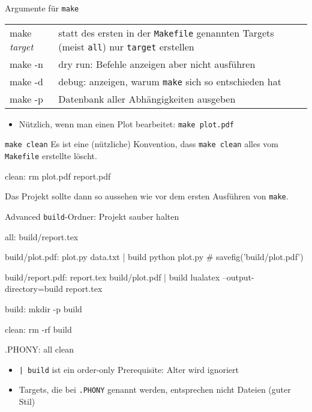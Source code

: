 \begin{frame}[fragile]{Argumente für \texttt{make}}
  \begin{tabu}{>{\ttfamily}l X[,L]}
    make \textit{target} & statt des ersten in der \texttt{Makefile} genannten Targets (meist \texttt{all}) nur \texttt{target} erstellen \\
    make -n              & dry run: Befehle anzeigen aber nicht ausführen \\
    make -d              & debug: anzeigen, warum \texttt{make} sich so entschieden hat \\
    make -p              & Datenbank aller Abhängigkeiten ausgeben
  \end{tabu}
  \begin{itemize}
    \item Nützlich, wenn man einen Plot bearbeitet: \texttt{make plot.pdf}
  \end{itemize}
\end{frame}

\begin{frame}[fragile]{\texttt{make clean}}
  Es ist eine (nützliche) Konvention, dass \texttt{make clean} alles vom \texttt{Makefile} erstellte löscht.

  \begin{center}
    \begin{lstmake}
      clean:
          rm plot.pdf report.pdf
    \end{lstmake}
  \end{center}

  Das Projekt sollte dann so aussehen wie vor dem ersten Ausführen von \texttt{make}.
\end{frame}

\begin{frame}[fragile]{Advanced}
  \texttt{build}-Ordner: Projekt sauber halten

  \begin{center}
    \begin{lstmake}
      all: build/report.tex

      build/plot.pdf: plot.py data.txt | build
          python plot.py  # savefig('build/plot.pdf')

      build/report.pdf: report.tex build/plot.pdf | build
          lualatex --output-directory=build report.tex

      build:
          mkdir -p build

      clean:
          rm -rf build

      .PHONY: all clean
    \end{lstmake}
  \end{center}

  \begin{itemize}
    \item \texttt{| build} ist ein order-only Prerequisite: Alter wird ignoriert
    \item Targets, die bei \texttt{.PHONY} genannt werden, entsprechen nicht Dateien (guter Stil)
  \end{itemize}
\end{frame}

